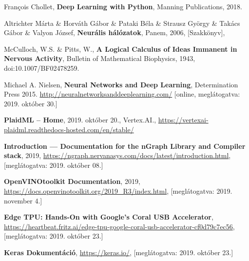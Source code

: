 \begin{thebibliography}{9}
	François Chollet,
	\textbf{Deep Learning with Python},
	Manning Publications,
	2018.

	Altrichter Márta \& Horváth Gábor \& Pataki Béla \& Strausz György \& Takács Gábor \& Valyon József,
	\textbf{Neurális hálózatok},
	Panem,
	2006,
	[Szakkönyv],

	McCulloch, W.S. \& Pitts, W.,
	\textbf{A Logical Calculus of Ideas Immanent in Nervous Activity},
	Bulletin of Mathematical Biophysics,
	1943,
	doi:10.1007/BF02478259.

	Michael A. Nielsen,
	\textbf{Neural Networks and Deep Learning},
	Determination Press
	2015.
	\newline\url{http://neuralnetworksanddeeplearning.com/}
	[online, meglátogatva: 2019. október 30.]
	



	\textbf{PlaidML -- Home},
	2019. október 20.,
	Vertex.AI.,
	\newline\url{https://vertexai-plaidml.readthedocs-hosted.com/en/stable/}

	\textbf{Introduction --- Documentation for the {nGraph} Library and Compiler stack},
	2019,
	\newline\url{https://ngraph.nervanasys.com/docs/latest/introduction.html},
	[meglátogatva: 2019. október 08.]

	\textbf{OpenVINO\textsuperscript{\texttrademark}\space toolkit Documentation},
	2019,
	\newline\url{https://docs.openvinotoolkit.org/2019_R3/index.html},
	[meglátogatva: 2019. november 4.]


	\textbf{Edge TPU: Hands-On with Google’s Coral USB Accelerator},
	\newline\url{https://heartbeat.fritz.ai/edge-tpu-google-coral-usb-accelerator-cf0d79c7ec56},
	[meglátogatva: 2019. október 23.]

	\textbf{Keras Dokumentáció},
	\newline\url{https://keras.io/},
	[meglátogatva: 2019. október 23.]


\end{thebibliography}
